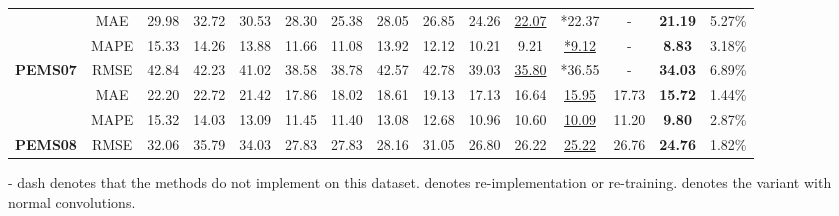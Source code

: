 \documentclass{article}
\begin{document}
\begin{table*}[h]
\begin{threeparttable}
{\begin{tabular}{c|c|c|c|c|c|c|c|c|c|c|c|c|c|c}
                                    & MAE                                & 29.98 & 32.72 & 30.53 & 28.30 & 25.38 & 28.05     & 26.85        & 24.26  & {\color[RGB]{0, 100, 148} \underline{22.07}}                                      & *22.37 & -     & \textbf{21.19} & {\color[RGB]{230, 57, 70}  5.27\%}  \\ & MAPE                               & 15.33 & 14.26 & 13.88 & 11.66 & 11.08 & 13.92     & 12.12        & 10.21  & 9.21                                        & {\color[RGB]{0, 100, 148} \underline{ *9.12}}  & -     & \textbf{8.83}  & {\color[RGB]{230, 57, 70}  3.18\%}  \\ \multirow{-3}{*}{\textbf{PEMS07}}   & RMSE                               & 42.84 & 42.23 & 41.02 & 38.58 & 38.78 & 42.57     & 42.78        & 39.03  &{\color[RGB]{0, 100, 148} \underline{35.80}}                                       & *36.55 & -     & \textbf{34.03} & {\color[RGB]{230, 57, 70}  6.89\%}  \\ \hline
                                    & MAE                                & 22.20 & 22.72 & 21.42 & 17.86 & 18.02 & 18.61     & 19.13        & 17.13  & 16.64                                       & {\color[RGB]{0, 100, 148} \underline{15.95}} & 17.73 & \textbf{15.72} & {\color[RGB]{230, 57, 70} 1.44\%}  \\ & MAPE                               & 15.32 & 14.03 & 13.09 & 11.45 & 11.40 & 13.08     & 12.68        & 10.96  & 10.60                                       & {\color[RGB]{0, 100, 148} \underline{10.09}} & 11.20 & \textbf{9.80}  & {\color[RGB]{230, 57, 70}  2.87\%}  \\ \multirow{-3}{*}{\textbf{PEMS08}}   & RMSE                               & 32.06 & 35.79 & 34.03 & 27.83 & 27.83 & 28.16     & 31.05        & 26.80  & 26.22                                       & {\color[RGB]{0, 100, 148} \underline{25.22}} & 26.76 & \textbf{24.76} & {\color[RGB]{230, 57, 70}  1.82\%}  \\ \hline
\end{tabular}}
\begin{tablenotes} \tiny
		\item  - dash denotes that the methods do not implement on this dataset. \hspace{2pt}  denotes re-implementation or re-training. \hspace{2pt}  denotes the variant with normal convolutions. \end{tablenotes} 

\end{threeparttable} \label{tab:traffic}
\end{table*}
\end{document}
